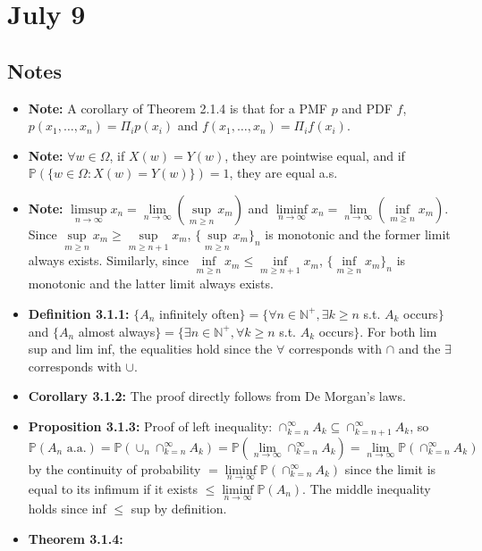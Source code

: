\documentclass[12pt]{article}
\newcommand{\p}{\mathbb{P}}
\begin{document}
\section*{July 9}

\subsection*{Notes}
\begin{itemize}
    \item \textbf{Note:} A corollary of Theorem 2.1.4 is that for a PMF $p$ and PDF $f$, $p(x_1, \ldots, x_n) = \Pi_i p(x_i)$ and $f(x_1, \ldots, x_n) = \Pi_i f(x_i)$.
    \item \textbf{Note:} $\forall w \in \Omega$, if $X(w) = Y(w)$, they are pointwise equal, and if $\p(\{w \in \Omega: X(w) = Y(w)\}) = 1$, they are equal a.s.
    \item \textbf{Note:} $\limsup \limits_{n \to \infty} x_n = \lim \limits_{n \to \infty} (\sup \limits_{m \geq n} x_m)$ and $\liminf \limits_{n \to \infty} x_n = \lim \limits_{n \to \infty} (\inf \limits_{m \geq n} x_m)$. Since $\sup \limits_{m \geq n} x_m \geq \sup \limits_{m \geq n+1} x_{m}$, $\{\sup \limits_{m \geq n} x_m\}_n$ is monotonic and the former limit always exists. Similarly, since $\inf \limits_{m \geq n} x_m \leq \inf \limits_{m \geq n+1} x_{m}$, $\{\inf \limits_{m \geq n} x_m\}_n$ is monotonic and the latter limit always exists.
    \item \textbf{Definition 3.1.1:} $\{A_n$ infinitely often$\} = \{\forall n \in \mathbb{N}^+, \exists k \geq n$ s.t. $A_k$ occurs$\}$ and $\{A_n$ almost always$\} = \{\exists n \in \mathbb{N}^+, \forall k \geq n$ s.t. $A_k$ occurs$\}$. For both lim sup and lim inf, the equalities hold since the $\forall$ corresponds with $\cap$ and the $\exists$ corresponds with $\cup$.
    \item \textbf{Corollary 3.1.2:} The proof directly follows from De Morgan's laws.
    \item \textbf{Proposition 3.1.3:} Proof of left inequality: $\cap_{k=n}^\infty A_k \subseteq \cap_{k=n+1}^\infty A_k$, so $\p(A_n \text{ a.a.}) = \p(\cup_n \cap_{k=n}^\infty A_k) = \p(\lim \limits_{n\to\infty} \cap_{k=n}^\infty A_k) = \lim \limits_{n \to \infty} \p(\cap_{k=n}^\infty A_k)$ by the continuity of probability $= \liminf \limits_{n \to \infty} \p(\cap_{k=n}^\infty A_k)$ since the limit is equal to its infimum if it exists $\leq \liminf \limits_{n \to \infty} \p(A_n)$. The middle inequality holds since inf $\leq$ sup by definition.
    \item \textbf{Theorem 3.1.4:}

\end{itemize}
\end{document}
